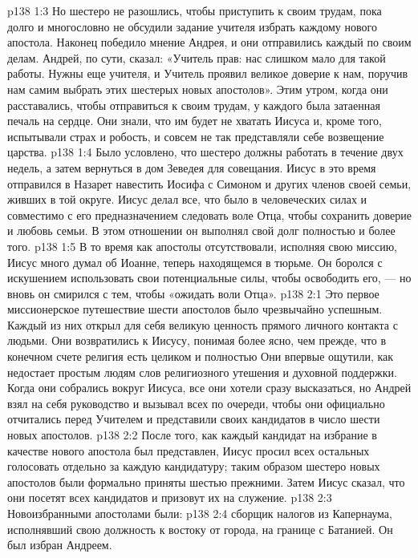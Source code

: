 \vs p138 1:3 Но шестеро не разошлись, чтобы приступить к своим трудам, пока долго и многословно не обсудили задание учителя избрать каждому нового апостола. Наконец победило мнение Андрея, и они отправились каждый по своим делам. Андрей, по сути, сказал: «Учитель прав: нас слишком мало для такой работы. Нужны еще учителя, и Учитель проявил великое доверие к нам, поручив нам самим выбрать этих шестерых новых апостолов». Этим утром, когда они расставались, чтобы отправиться к своим трудам, у каждого была затаенная печаль на сердце. Они знали, что им будет не хватать Иисуса и, кроме того, испытывали страх и робость, и совсем не так представляли себе возвещение царства.
\vs p138 1:4 Было условлено, что шестеро должны работать в течение двух недель, а затем вернуться в дом Зеведея для совещания. Иисус в это время отправился в Назарет навестить Иосифа с Симоном и других членов своей семьи, живших в той округе. Иисус делал все, что было в человеческих силах и совместимо с его предназначением следовать воле Отца, чтобы сохранить доверие и любовь семьи. В этом отношении он выполнял свой долг полностью и более того.
\vs p138 1:5 В то время как апостолы отсутствовали, исполняя свою миссию, Иисус много думал об Иоанне, теперь находящемся в тюрьме. Он боролся с искушением использовать свои потенциальные силы, чтобы освободить его, --- но вновь он смирился с тем, чтобы «ожидать воли Отца».
\vs p138 2:1 Это первое миссионерское путешествие шести апостолов было чрезвычайно успешным. Каждый из них открыл для себя великую ценность прямого личного контакта с людьми. Они возвратились к Иисусу, понимая более ясно, чем прежде, что в конечном счете религия есть целиком и полностью  Они впервые ощутили, как недостает простым людям слов религиозного утешения и духовной поддержки. Когда они собрались вокруг Иисуса, все они хотели сразу высказаться, но Андрей взял на себя руководство и вызывал всех по очереди, чтобы они официально отчитались перед Учителем и представили своих кандидатов в число шести новых апостолов.
\vs p138 2:2 После того, как каждый кандидат на избрание в качестве нового апостола был представлен, Иисус просил всех остальных голосовать отдельно за каждую кандидатуру; таким образом шестеро новых апостолов были формально приняты шестью прежними. Затем Иисус сказал, что они посетят всех кандидатов и призовут их на служение.
\vs p138 2:3 Новоизбранными апостолами были:
\vs p138 2:4 \bibnobreakspace {} сборщик налогов из Капернаума, исполнявший свою должность к востоку от города, на границе с Батанией. Он был избран Андреем.
